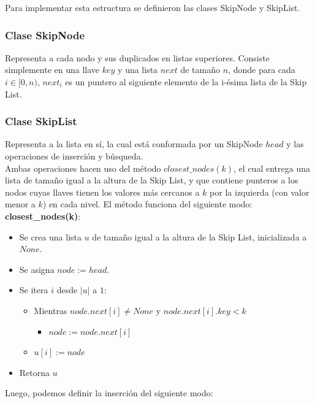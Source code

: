 \documentclass[12pt,letterpaper]{article}
\begin{document}
Para implementar esta estructura se definieron las clases SkipNode y SkipList.

\subsubsection{Clase SkipNode}
Representa a cada nodo y sus duplicados en listas superiores. Consiste simplemente en una llave $key$ y una lista $next$ de tamaño $n$, donde para cada $i \in [0,n)$, $next_{i}$ es un puntero al siguiente elemento de la i-ésima lista de la Skip List.

\subsubsection{Clase SkipList}
Representa a la lista en sí, la cual está conformada por un SkipNode $head$ y las operaciones de inserción y búsqueda.\\

Ambas operaciones hacen uso del método $closest\_nodes(k)$, el cual entrega una lista de tamaño igual a la altura de la Skip List, y que contiene punteros a los nodos cuyas llaves tienen los valores más cercanos a $k$ por la izquierda (con valor menor a $k$) en cada nivel. El método funciona del siguiente modo:\\

\textbf{closest\_nodes(k)}:
\begin{itemize}
\item	Se crea una lista $u$ de tamaño igual a la altura de la Skip List, inicializada a $None$.
\item	Se asigna $node := head$.
\item	Se itera $i$ desde $|u|$ a $1$:
	\begin{itemize}
	\item	Mientras $node.next[i] \not = None$ y $node.next[i].key < k$
		\begin{itemize}
		\item	$node := node.next[i]$
		\end{itemize}
	\item	$u[i] := node$
	\end{itemize}
\item	Retorna $u$
\end{itemize}

\vspace{0.5cm}
Luego, podemos definir la inserción del siguiente modo:\\
\end{document}
